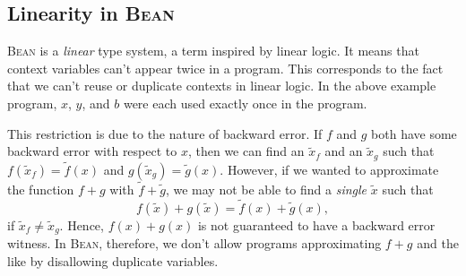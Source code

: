 \documentclass[a4paper]{article}
\newcommand{\Bean}{\textsc{Bean}}
\begin{document}
\subsection{Linearity in \Bean}
\Bean{} is a \emph{linear} type system, a term inspired by linear logic. It means that context variables can't appear twice in a program. This corresponds to the fact that we can't reuse or duplicate contexts in linear logic. In the above example program, $x$, $y$, and $b$ were each used exactly once in the program. 

This restriction is due to the nature of backward error. If $f$ and $g$ both have some backward error with respect to $x$, then we can find an $\tilde{x}_f$ and an $\tilde{x}_g$ such that $f(\tilde{x}_f)=\tilde{f}(x)$ and $g(\tilde{x}_g)=\tilde{g}(x)$. However, if we wanted to approximate the function $f+g$ with $\tilde{f}+\tilde{g}$, we may not be able to find a \emph{single} $\tilde{x}$ such that 
\begin{equation*}
    f(\tilde{x})+g(\tilde{x})=\tilde{f}(x)+\tilde{g}(x),
\end{equation*}
if $\tilde{x}_f\neq \tilde{x}_g$. Hence, $f(x)+g(x)$ is not guaranteed to have a backward error witness. In \Bean{}, therefore, we don't allow programs approximating $f+g$ and the like by disallowing duplicate variables.
\end{document}
